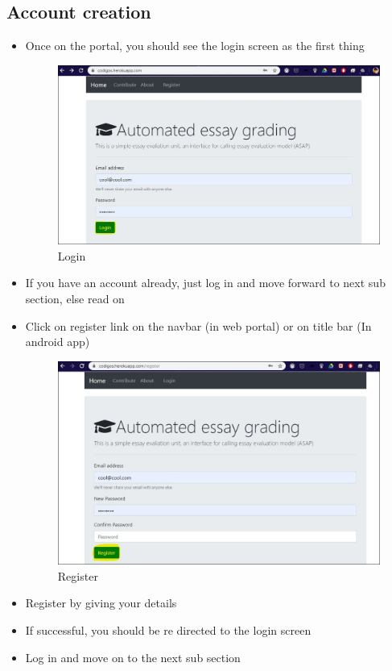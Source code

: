 \documentclass{article}
\begin{document}
\subsection{Account creation}
\begin{itemize}
    \item Once on the portal, you should see the login screen as the first thing
    \begin{figure}
    \includegraphics[width=11cm]{5}
    \caption{\label{fig:your-figure2}Login}
    \end{figure}
    \item If you have an account already, just log in and move forward to next sub section, else read on
    \item Click on register link on the navbar (in web portal) or on title bar (In android app)
    \begin{figure}
    \includegraphics[width=11cm]{6}
    \caption{\label{fig:your-figure2}Register}
    \end{figure}
    \item Register by giving your details
    \item If successful, you should be re directed to the login screen
    \item Log in and move on to the next sub section
\end{itemize}
\end{document}
